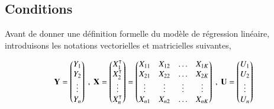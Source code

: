 \documentclass[10pt, reqno]{amsart}
\begin{document}
\subsection{Conditions}
Avant de donner une définition formelle du modèle de régression linéaire, introduisons les notations vectorielles et matricielles suivantes,

\begin{align*}
\boldY=
\begin{pmatrix}
Y_1\\
Y_2\\
\vdots\\
Y_n
\end{pmatrix}
\  , \
\boldX=
\begin{pmatrix}
X_1^\tr\\
X_2^\tr\\
\vdots\\
X_n^\tr
\end{pmatrix}
=
\begin{pmatrix}
X_{11} & X_{12}&\ldots&X_{1K}\\
X_{21} & X_{22}&\ldots&X_{2K}\\
\vdots&\vdots&\vdots&\vdots\\
X_{n1} & X_{n2}&\ldots&X_{nK}
\end{pmatrix}
\  , \
\boldU=
\begin{pmatrix}
U_1\\
U_2\\
\vdots\\
U_n
\end{pmatrix}
\end{align*}
\end{document}
